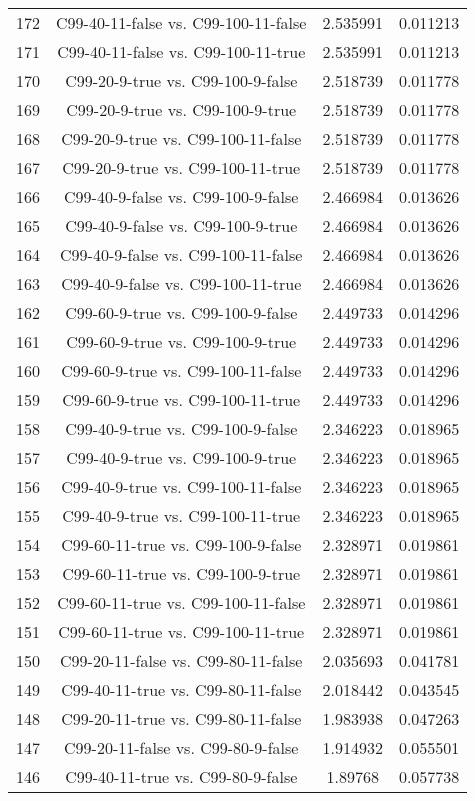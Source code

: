 \documentclass[a4paper,10pt]{article}
\begin{document}
\begin{landscape}
\begin{table}[!htp]
\begin{tabular}{cccc}
172&C99-40-11-false vs. C99-100-11-false&2.535991&0.011213\\
171&C99-40-11-false vs. C99-100-11-true&2.535991&0.011213\\
170&C99-20-9-true vs. C99-100-9-false&2.518739&0.011778\\
169&C99-20-9-true vs. C99-100-9-true&2.518739&0.011778\\
168&C99-20-9-true vs. C99-100-11-false&2.518739&0.011778\\
167&C99-20-9-true vs. C99-100-11-true&2.518739&0.011778\\
166&C99-40-9-false vs. C99-100-9-false&2.466984&0.013626\\
165&C99-40-9-false vs. C99-100-9-true&2.466984&0.013626\\
164&C99-40-9-false vs. C99-100-11-false&2.466984&0.013626\\
163&C99-40-9-false vs. C99-100-11-true&2.466984&0.013626\\
162&C99-60-9-true vs. C99-100-9-false&2.449733&0.014296\\
161&C99-60-9-true vs. C99-100-9-true&2.449733&0.014296\\
160&C99-60-9-true vs. C99-100-11-false&2.449733&0.014296\\
159&C99-60-9-true vs. C99-100-11-true&2.449733&0.014296\\
158&C99-40-9-true vs. C99-100-9-false&2.346223&0.018965\\
157&C99-40-9-true vs. C99-100-9-true&2.346223&0.018965\\
156&C99-40-9-true vs. C99-100-11-false&2.346223&0.018965\\
155&C99-40-9-true vs. C99-100-11-true&2.346223&0.018965\\
154&C99-60-11-true vs. C99-100-9-false&2.328971&0.019861\\
153&C99-60-11-true vs. C99-100-9-true&2.328971&0.019861\\
152&C99-60-11-true vs. C99-100-11-false&2.328971&0.019861\\
151&C99-60-11-true vs. C99-100-11-true&2.328971&0.019861\\
150&C99-20-11-false vs. C99-80-11-false&2.035693&0.041781\\
149&C99-40-11-true vs. C99-80-11-false&2.018442&0.043545\\
148&C99-20-11-true vs. C99-80-11-false&1.983938&0.047263\\
147&C99-20-11-false vs. C99-80-9-false&1.914932&0.055501\\
146&C99-40-11-true vs. C99-80-9-false&1.89768&0.057738\\

\end{tabular}
\end{table}
\end{landscape}
\end{document}
